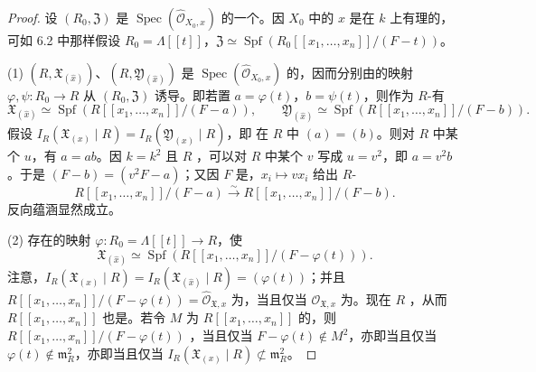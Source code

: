 \begin{proof}
设 $(R_0,\mathfrak Z)$ 是 $\operatorname{Spec}(\widehat{\mathcal O}_{X_0,x})$ 的一个。因 $X_0$ 中的 $x$ 是在 $k$ 上有理的，可如 6.2 中那样假设 $R_0=\Lambda[[t]]$，$\mathfrak Z\simeq\operatorname{Spf}(R_0[[x_1,\ldots,x_n]]/(F-t))$。

(1) $(R,\mathfrak X_{(\widehat x)})$、$(R,\mathfrak Y_{(\widehat x)})$ 是 $\operatorname{Spec}(\widehat{\mathcal O}_{X_0,x})$ 的，因而分别由的映射 $\varphi,\psi:R_0\to R$ 从 $(R_0,\mathfrak Z)$ 诱导。即若置 $a=\varphi(t)$，$b=\psi(t)$，则作为 $R$-有
\[
\mathfrak X_{(\widehat x)}\simeq\operatorname{Spf}(R[[x_1,\ldots,x_n]]/(F-a)),
\qquad
\mathfrak Y_{(\widehat x)}\simeq\operatorname{Spf}(R[[x_1,\ldots,x_n]]/(F-b)).
\]
假设 $I_R(\mathfrak X_{(x)}\mid R)=I_R(\mathfrak Y_{(x)}\mid R)$，即
在 $R$ 中 $(a)=(b)$。则对 $R$ 中某个 $u$，有 $a=ab$。因 $k=k^2$ 且 $R$ ，可以对 $R$ 中某个 $v$ 写成 $u=v^2$，即 $a=v^2b$。于是 $(F-b)=(v^2F-a)$；又因 $F$ 是，$x_i\mapsto vx_i$ 给出 $R$-
\[
R[[x_1,\ldots,x_n]]/(F-a)\xrightarrow\sim R[[x_1,\ldots,x_n]]/(F-b).
\]
反向蕴涵显然成立。

(2) 存在的映射 $\varphi:R_0=\Lambda[[t]]\to R$，使
\[
\mathfrak X_{(\widehat x)}\simeq\operatorname{Spf}(R[[x_1,\ldots,x_n]]/(F-\varphi(t))).
\]
注意，$I_R(\mathfrak X_{(x)}\mid R)=I_R(\mathfrak X_{(\widehat x)}\mid R)=(\varphi(t))$；并且 $R[[x_1,\ldots,x_n]]/(F-\varphi(t))=\widehat{\mathcal O}_{\mathfrak X,x}$ 为，当且仅当 $\mathcal O_{\mathfrak X,x}$ 为。现在 $R$ ，从而 $R[[x_1,\ldots,x_n]]$ 也是。若令 $M$ 为 $R[[x_1,\ldots,x_n]]$ 的，则 $R[[x_1,\ldots,x_n]]/(F-\varphi(t))$ ，当且仅当 $F-\varphi(t)\notin M^2$，亦即当且仅当 $\varphi(t)\notin\mathfrak m_R^2$，亦即当且仅当 $I_R(\mathfrak X_{(x)}\mid R)\not\subset\mathfrak m_R^2$。
\end{proof}

